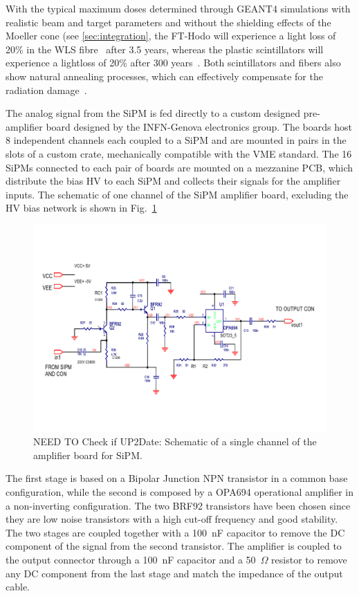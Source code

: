 With the typical maximum doses determined through GEANT4 simulations with realistic beam and target parameters and without the shielding effects of the Moeller cone (see \ref{sec:integration}, the FT-Hodo will experience a light loss of 20\% in the WLS fibre~\cite{ft-tdr} after 3.5 years, whereas the plastic scintillators will experience a lightloss of 20\% after 300 years~\cite{ft-tdr}. Both scintillators and fibers also show natural annealing processes, which can effectively compensate for the radiation damage~\cite{ft-tdr}.  

The analog signal from the SiPM is fed directly to a custom designed pre-amplifier board designed by the INFN-Genova electronics group. The boards host 8 independent channels each coupled to a SiPM and are mounted in pairs in the slots of a custom crate, mechanically compatible with the VME standard. The 16 SiPMs connected to each pair of boards are mounted on a mezzanine PCB, which distribute the bias HV to each SiPM and collects their signals for the amplifier inputs. The schematic of one channel of the SiPM amplifier board, excluding the HV bias network is shown in Fig.~\ref{Fig:FTHODOAmpBoard}  
\begin{figure}[th!]
\centering 
\includegraphics[width=0.95\columnwidth]{./fig/FTHODOAmpBoard.pdf} 
\caption{NEED TO Check if UP2Date: Schematic of a single channel of the amplifier board for SiPM.} 
\label{Fig:FTHODOAmpBoard} 
\end{figure}
The first stage is based on a Bipolar Junction NPN transistor in a common base configuration, while the second is composed by a OPA694 operational amplifier in a non-inverting configuration. The two BRF92 transistors have been chosen since they are low noise transistors with a high cut-off frequency and good stability. The two stages are coupled together with a 100~nF capacitor to remove the DC component of the signal from the second transistor. The amplifier is coupled to the output connector through a 100~nF capacitor and a 50~$\Omega$ resistor to remove any DC component from the last stage and match the impedance of the output cable. 


